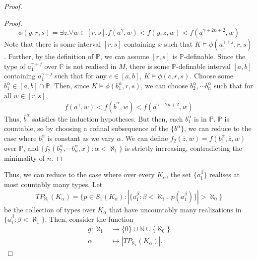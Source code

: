 \documentclass[10pt,a4paper]{amsart}
\newcommand{\bP}{\mathbb P}
\newcommand{\oa}{\overline{a}}
\newcommand{\ob}{\overline{b}}
\newcommand{\oz}{\overline{z}}
\begin{document}
\begin{proof}
\begin{proof}
        \[
        \phi(y,r,s) = \exists \oz. \forall w \in [r,s]. f(\oa^\gamma,w)<f(y,\oz,w)<f(\oa^{\gamma+2n+2},w)
        \]
        Note that there is some interval $[r,s]$ containing $x$ such that $K \models \phi(a_1^{\gamma+j},r,s)$. Further, by the definition of $\bP$, we can assume $[r,s]$ is $\bP$-definable.
        Since the type of $a_1^{\gamma+j}$ over $\bP$ is not realised in $M$, there is some $\bP$-definable interval $[a,b]$ containing $a_1^{\gamma+j}$ such that for any $c \in [a,b]$, $K \models \phi(c,r,s)$. Choose some $b_1^{\alpha} \in [a,b] \cap \bP$.
        Then, since $K \models \phi(b_1^{\alpha},r,s)$, we can choose $b_2^{\alpha}, \cdots b_n^{\alpha}$ such that for all $w \in [r,s]$, \[f(\oa^{\gamma},w)<f(\ob^{\alpha},w)<f(\oa^{\gamma+2n+2},w)\]
        Thus, $\ob^{\alpha}$ satisfies the induction hypotheses. But then, each $b_1^{\alpha}$ is in $\bP$.
        $\bP$ is countable, so by choosing a cofinal subsequence of the $\{b^{\alpha}\}$, we can reduce to the case where $b_1^{\alpha}$ is constant as we vary $\alpha$. We can define $f_2(\oz,w) = f(b_1^\alpha,\oz,w)$ over $\bP$, and $\{f_2(b_2^\alpha, \cdots b_n^\alpha,x) : \alpha<\aleph_1\}$ is strictly increasing, contradicting the minimality of $n$.
    \end{proof}

    Thus, we can reduce to the case where over every $K_\alpha$, the set $\{a_1^{\beta}\}$ realises at most countably many types. Let 
    \[TP_{\aleph_1}(K_\alpha)=\big\{p \in S_1(K_\alpha): |\{a_1^\beta: \beta < \aleph_1,\, p(a_1^\beta)\}|>\aleph_0\big\}\]
    be the collection of types over $K_\alpha$ that have uncountably many realizations in $\{a_1^\beta: \beta < \aleph_1\}$.     Then, consider the function
    \begin{align*}
    g : \aleph_1 &\rightarrow \{0\} \cup \mathbb{N} \cup \{\aleph_0\}\\
    \alpha &\mapsto |TP_{\aleph_1}(K_\alpha)|.
    \end{align*}
    

\end{proof}
\end{document}
